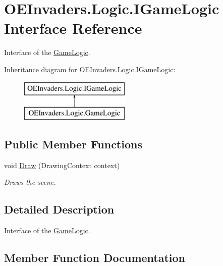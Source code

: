 \hypertarget{interface_o_e_invaders_1_1_logic_1_1_i_game_logic}{}\section{O\+E\+Invaders.\+Logic.\+I\+Game\+Logic Interface Reference}
\label{interface_o_e_invaders_1_1_logic_1_1_i_game_logic}


Interface of the \mbox{\hyperlink{class_o_e_invaders_1_1_logic_1_1_game_logic}{Game\+Logic}}.  


Inheritance diagram for O\+E\+Invaders.\+Logic.\+I\+Game\+Logic\+:\begin{figure}[H]
\begin{center}
\leavevmode
\includegraphics[height=2.000000cm]{interface_o_e_invaders_1_1_logic_1_1_i_game_logic}
\end{center}
\end{figure}
\subsection*{Public Member Functions}
\begin{DoxyCompactItemize}
\item 
void \mbox{\hyperlink{interface_o_e_invaders_1_1_logic_1_1_i_game_logic_a7afdd27b3cf620cd25c84e48a4d47ccd}{Draw}} (Drawing\+Context context)
\begin{DoxyCompactList}\small\item\em Draws the scene. \end{DoxyCompactList}\end{DoxyCompactItemize}


\subsection{Detailed Description}
Interface of the \mbox{\hyperlink{class_o_e_invaders_1_1_logic_1_1_game_logic}{Game\+Logic}}. 



\subsection{Member Function Documentation}
\mbox{\label{interface_o_e_invaders_1_1_logic_1_1_i_game_logic_a7afdd27b3cf620cd25c84e48a4d47ccd}} 
